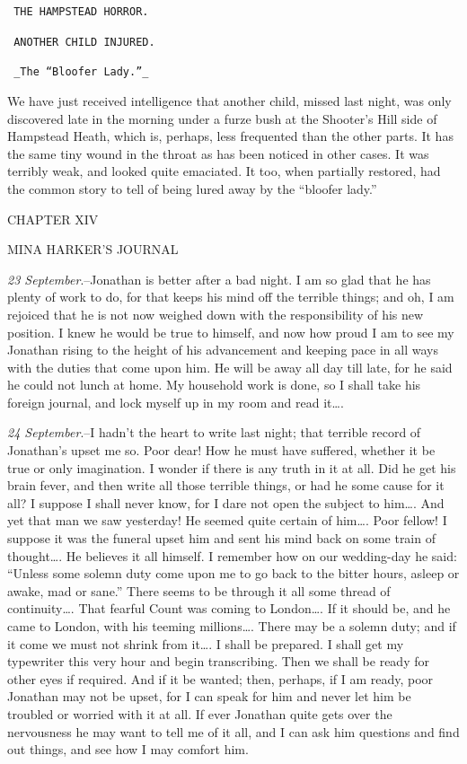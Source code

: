 \documentclass[12pt,openright]{book}
\begin{document}
\texttt{                     THE HAMPSTEAD HORROR.}

\texttt{                     ANOTHER CHILD INJURED.}

\texttt{                     \_The “Bloofer Lady.”\_}

We have just received intelligence that another child, missed last night, was only discovered late in the morning under a furze bush at the Shooter’s Hill side of Hampstead Heath, which is, perhaps, less frequented than the other parts. It has the same tiny wound in the throat as has been noticed in other cases. It was terribly weak, and looked quite emaciated. It too, when partially restored, had the common story to tell of being lured away by the “bloofer lady.”

CHAPTER XIV

MINA HARKER’S JOURNAL

\textit{23 September}.–Jonathan is better after a bad night. I am so glad that he has plenty of work to do, for that keeps his mind off the terrible things; and oh, I am rejoiced that he is not now weighed down with the responsibility of his new position. I knew he would be true to himself, and now how proud I am to see my Jonathan rising to the height of his advancement and keeping pace in all ways with the duties that come upon him. He will be away all day till late, for he said he could not lunch at home. My household work is done, so I shall take his foreign journal, and lock myself up in my room and read it….

\textit{24 September}.–I hadn’t the heart to write last night; that terrible record of Jonathan’s upset me so. Poor dear! How he must have suffered, whether it be true or only imagination. I wonder if there is any truth in it at all. Did he get his brain fever, and then write all those terrible things, or had he some cause for it all? I suppose I shall never know, for I dare not open the subject to him…. And yet that man we saw yesterday! He seemed quite certain of him…. Poor fellow! I suppose it was the funeral upset him and sent his mind back on some train of thought…. He believes it all himself. I remember how on our wedding-day he said: “Unless some solemn duty come upon me to go back to the bitter hours, asleep or awake, mad or sane.” There seems to be through it all some thread of continuity…. That fearful Count was coming to London…. If it should be, and he came to London, with his teeming millions…. There may be a solemn duty; and if it come we must not shrink from it…. I shall be prepared. I shall get my typewriter this very hour and begin transcribing. Then we shall be ready for other eyes if required. And if it be wanted; then, perhaps, if I am ready, poor Jonathan may not be upset, for I can speak for him and never let him be troubled or worried with it at all. If ever Jonathan quite gets over the nervousness he may want to tell me of it all, and I can ask him questions and find out things, and see how I may comfort him.
\end{document}
